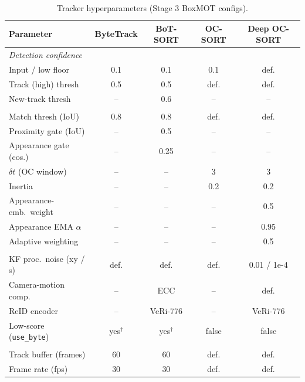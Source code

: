 \begin{table}[ht]
  \centering
  \caption{Tracker hyperparameters (Stage 3 BoxMOT configs).}
  \label{tab:tracker_hparams}
  \small
  \setlength{\tabcolsep}{5pt}
  \begin{tabular}{lcccc}
    \toprule
    Parameter & ByteTrack & BoT-SORT & OC-SORT & Deep OC-SORT \\
    \midrule
    \multicolumn{5}{l}{\textit{Detection confidence}} \\
    Input / low floor       & 0.1   & 0.1   & 0.1   & def. \\
    Track (high) thresh     & 0.5   & 0.5   & def.  & def. \\
    New-track thresh        & --    & 0.6   & --    & -- \\
    \addlinespace
    \multicolumn{5}{l}{\textit{Association}} \\
    Match thresh (IoU)      & 0.8   & 0.8   & def.  & def. \\
    Proximity gate (IoU)    & --    & 0.5   & --    & -- \\
    Appearance gate (cos.)  & --    & 0.25  & --    & -- \\
    $\delta t$ (OC window)  & --    & --    & 3     & 3 \\
    Inertia                 & --    & --    & 0.2   & 0.2 \\
    Appearance-emb.\ weight & --    & --    & --    & 0.5 \\
    Appearance EMA $\alpha$ & --    & --    & --    & 0.95 \\
    Adaptive weighting      & --    & --    & --    & 0.5 \\
    \addlinespace
    \multicolumn{5}{l}{\textit{Motion / appearance}} \\
    KF proc.\ noise (xy / s)& def.  & def.  & def.  & 0.01 / 1e-4 \\
    Camera-motion comp.     & --    & ECC   & --    & def. \\
    ReID encoder            & --    & VeRi-776 & -- & VeRi-776 \\
    Low-score (\texttt{use\_byte}) & yes$^\dagger$ & yes$^\dagger$ & false & false \\
    \addlinespace
    \multicolumn{5}{l}{\textit{Track management}} \\
    Track buffer (frames)   & 60    & 60    & def.  & def. \\
    Frame rate (fps)        & 30    & 30    & def.  & def. \\

\end{tabular}
\end{table}
